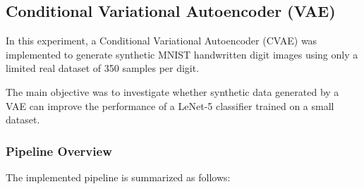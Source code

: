 \begingroup
\graphicspath{{../prob_1/Figures/}}


\subsection{Conditional Variational Autoencoder (VAE)}

In this experiment, a Conditional Variational Autoencoder (CVAE) was implemented to generate synthetic MNIST handwritten digit images using only a limited real dataset of 350 samples per digit.

The main objective was to investigate whether synthetic data generated by a VAE can improve the performance of a LeNet-5 classifier trained on a small dataset.

\subsubsection{Pipeline Overview}

The implemented pipeline is summarized as follows:

